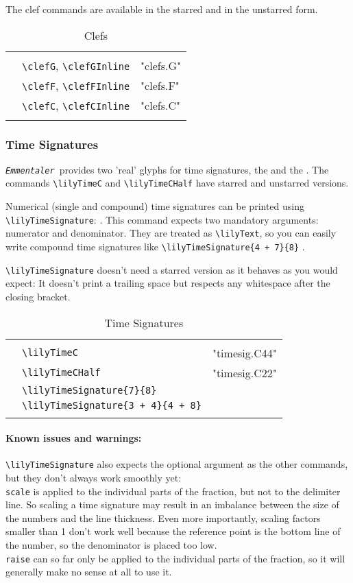 \documentclass{article}
\newcommand*{\emmentaler}{\texttt{\textit{Emmentaler }}}
\newcommand*{\cmd}[1]{\texttt{\textbackslash #1}}
\newcommand{\tmpCaption}{} %
\newcommand{\tmpLabel}{}
\newenvironment{reftable}[2]
	{%
		\renewcommand{\tmpCaption}{#1}
		\renewcommand{\tmpLabel}{#2}
		\begin{table}[ht]
		\begin{center}
		\begin{tabular}[t]{lll}
		\hline
		&\\
	}
	{%
		&\\
		\hline
		\end{tabular}
		\caption{\tmpCaption}
		\label{table:\tmpLabel}
		\end{center}
		\end{table}
	}
\begin{document}
The clef commands are available in the starred and in the unstarred form.

\begin{reftable}{Clefs}{clefs}
\clefGInline & \cmd{clefG}, \cmd{clefGInline} & "clefs.G"\\
\clefFInline & \cmd{clefF}, \cmd{clefFInline} & "clefs.F"\\
\clefCInline & \cmd{clefC}, \cmd{clefCInline} & "clefs.C"\\
\end{reftable}

\subsubsection{Time Signatures}
\emmentaler provides two 'real' glyphs for time signatures, the \lilyTimeC and the \lilyTimeCHalf*.
The commands \cmd{lilyTimeC} and \cmd{lilyTimeCHalf} have starred and unstarred versions. 

Numerical (single and compound) time signatures can be printed using \cmd{lilyTimeSignature}: .
This command expects two mandatory arguments: numerator and denominator.
They are treated as \cmd{lilyText}, so you can easily write compound time signatures like \cmd{lilyTimeSignature\{4 + 7\}\{8\}} .

\cmd{lilyTimeSignature} doesn't need a starred version as it behaves as you would expect: It doesn't print a trailing space but respects any whitespace after the closing bracket.

\begin{reftable}{Time Signatures}{timesignatures}
\lilyTimeC & \cmd{lilyTimeC} & "timesig.C44"\\
\lilyTimeCHalf & \cmd{lilyTimeCHalf} & "timesig.C22"\\
\lilyTimeSignature{7}{8} & \cmd{lilyTimeSignature\{7\}\{8\}}\\
\lilyTimeSignature{3 + 4}{4 + 8} & \cmd{lilyTimeSignature\{3 + 4\}\{4 + 8\}}\\
\end{reftable}

\paragraph*{Known issues and warnings:} \cmd{lilyTimeSignature} also expects the optional argument as the other commands, but they don't always work smoothly yet:\\
\texttt{scale} is applied to the individual parts of the fraction, but not to the delimiter line.
So scaling a time signature may result in an imbalance between the size of the numbers and the line thickness.
Even more importantly, scaling factors smaller than 1 don't work well because the reference point is the bottom line of the number, so the denominator is placed too low.\\
\texttt{raise} can so far only be applied to the individual parts of the fraction, so it will generally make no sense at all to use it.
\end{document}
